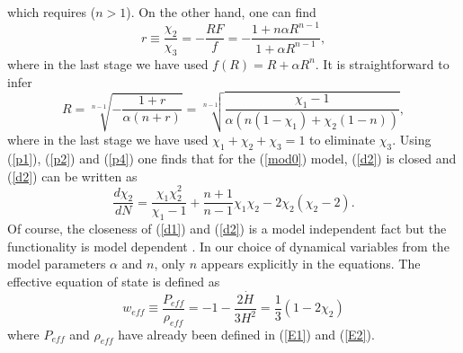 \documentclass[a4paper,11pt]{article}
\begin{document}
which requires ($n>1$). On the other hand, one can find
\begin{equation}
r\equiv\frac{\chi_2}{\chi_3}=-\frac{RF}{f}=-\frac{1+n\alpha R^{n-1}}{1+\alpha R^{n-1}},
\label{p3}
\end{equation}
where in the last stage we have used $f(R)=R+\alpha R^n$. 
It is straightforward to infer
\begin{equation}
R=\sqrt[n-1]{-\frac{1+r}{\alpha(n+r)}}=\sqrt[n-1]{\frac{\chi_1-1}{\alpha\left(n(1-\chi_1)+\chi_2(1-n)\right)}},
\label{p4}
\end{equation}
where in the last stage we have used $\chi_1+\chi_2+\chi_3=1$ to eliminate $\chi_3$. 
Using (\ref{p1}), (\ref{p2}) and (\ref{p4}) one finds that for the (\ref{mod0}) model, (\ref{d2}) is closed and (\ref{d2}) can be written as
\begin{equation}
\frac{d\chi_2}{d N}=\frac{\chi_1\chi_2 ^2}{\chi_1-1}+\frac{n+1}{n-1}\chi_1\chi_2-2\chi_2(\chi_2-2).
\label{d22}
\end{equation}
 Of course, the closeness of (\ref{d1}) and (\ref{d2}) is a model independent fact but the functionality is model dependent \cite{ama1}.
In our choice of dynamical variables from the model parameters $\alpha$ and $n$, only $n$ appears explicitly in the equations.
The effective equation of state is defined as
\begin{equation}
w_{eff} \equiv \frac{P_{eff}}{\rho_{eff}}= -1-\frac{2\dot{H}}{3 H^2}=\frac{1}{3}(1-2 \chi_2)
\end{equation}
where $P_{eff}$ and $\rho_{eff}$ have already been defined in (\ref{E1}) and (\ref{E2}).
\end{document}
